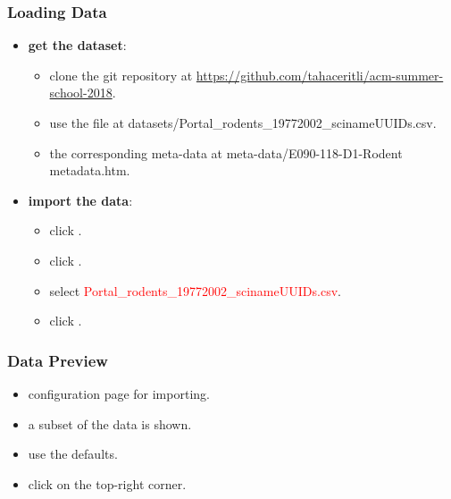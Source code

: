 \documentclass{beamer}					%
\begin{document}
\begin{frame}[c]
\frametitle{Loading Data}
\begin{itemize}
\item \textbf{get the dataset}:
\begin{itemize}
\item clone the git repository at \footnotesize{\url{https://github.com/tahaceritli/acm-summer-school-2018}}.
\item use the file at datasets/Portal\_rodents\_19772002\_scinameUUIDs.csv.
\item the corresponding meta-data at meta-data/E090-118-D1-Rodent metadata.htm.
\end{itemize}
\item \textbf{import the data}:
\begin{itemize}
\item click \say{\textcolor{red}{Create Project}}.
\item click \say{\textcolor{red}{Choose Files}}.
\item select \textcolor{red}{Portal\_rodents\_19772002\_scinameUUIDs.csv}.
\item click \say{\textcolor{red}{Next}}.
\end{itemize} 
\end{itemize}
\end{frame}

\begin{frame}[c]
\frametitle{Data Preview}
\begin{itemize}
\item configuration page for importing.
\item a subset of the data is shown.
\item use the defaults.
\item click \say{\textcolor{red}{Create Project}} on the top-right corner.
\end{itemize}
\end{frame}

\end{document}
